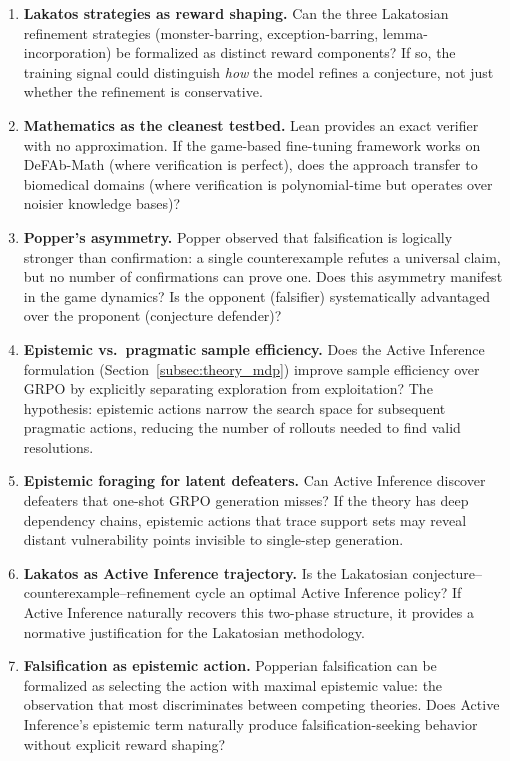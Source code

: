 \documentclass{article}
\theoremstyle{definition}
\begin{document}
\begin{enumerate}[nosep]
    \item \textbf{Lakatos strategies as reward shaping.} Can the three Lakatosian refinement strategies (monster-barring, exception-barring, lemma-incorporation) be formalized as distinct reward components? If so, the training signal could distinguish \emph{how} the model refines a conjecture, not just whether the refinement is conservative.
    \item \textbf{Mathematics as the cleanest testbed.} Lean provides an exact verifier with no approximation. If the game-based fine-tuning framework works on DeFAb-Math (where verification is perfect), does the approach transfer to biomedical domains (where verification is polynomial-time but operates over noisier knowledge bases)?
    \item \textbf{Popper's asymmetry.} Popper observed that falsification is logically stronger than confirmation: a single counterexample refutes a universal claim, but no number of confirmations can prove one. Does this asymmetry manifest in the game dynamics? Is the opponent (falsifier) systematically advantaged over the proponent (conjecture defender)?
    \item \textbf{Epistemic vs.\ pragmatic sample efficiency.} Does the Active Inference formulation (Section~\ref{subsec:theory_mdp}) improve sample efficiency over GRPO by explicitly separating exploration from exploitation? The hypothesis: epistemic actions narrow the search space for subsequent pragmatic actions, reducing the number of rollouts needed to find valid resolutions.
    \item \textbf{Epistemic foraging for latent defeaters.} Can Active Inference discover defeaters that one-shot GRPO generation misses? If the theory has deep dependency chains, epistemic actions that trace support sets may reveal distant vulnerability points invisible to single-step generation.
    \item \textbf{Lakatos as Active Inference trajectory.} Is the Lakatosian conjecture--counterexample--refinement cycle an optimal Active Inference policy? If Active Inference naturally recovers this two-phase structure, it provides a normative justification for the Lakatosian methodology.
    \item \textbf{Falsification as epistemic action.} Popperian falsification can be formalized as selecting the action with maximal epistemic value: the observation that most discriminates between competing theories. Does Active Inference's epistemic term naturally produce falsification-seeking behavior without explicit reward shaping?

\end{enumerate}
\end{document}
